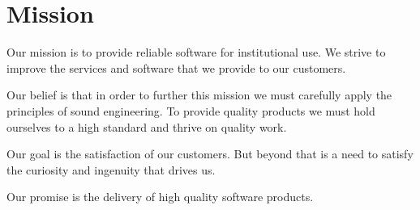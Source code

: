 
\chapter{Mission}

Our mission is to provide reliable software for institutional use. We strive to improve the services and software that we provide to our customers.

Our belief is that in order to further this mission we must carefully apply the principles of sound engineering. To provide quality products we must hold ourselves to a high standard and thrive on quality work.

Our goal is the satisfaction of our customers. But beyond that is a need to satisfy the curiosity and ingenuity that drives us.

Our promise is the delivery of high quality software products.
